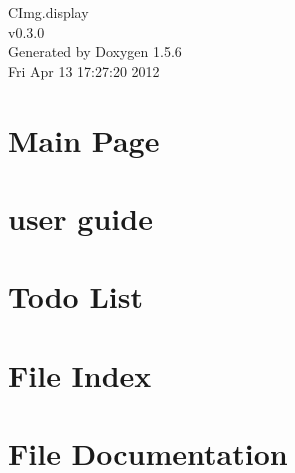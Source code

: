 \documentclass[a4paper]{book}
\begin{document}
\begin{titlepage}
\vspace*{7cm}
\begin{center}
{\Large CImg.display \\[1ex]\large v0.3.0 }\\
\vspace*{1cm}
{\large Generated by Doxygen 1.5.6}\\
\vspace*{0.5cm}
{\small Fri Apr 13 17:27:20 2012}\\
\end{center}
\end{titlepage}
\clearemptydoublepage
{}
\tableofcontents
\clearemptydoublepage
{}
\chapter{Main Page}
\label{index}\hypertarget{index}{}
\chapter{user guide}
\label{user}
\hypertarget{user}{}

\chapter{Todo List}
\label{todo}
\hypertarget{todo}{}

\chapter{File Index}

\chapter{File Documentation}

\printindex
\end{document}
